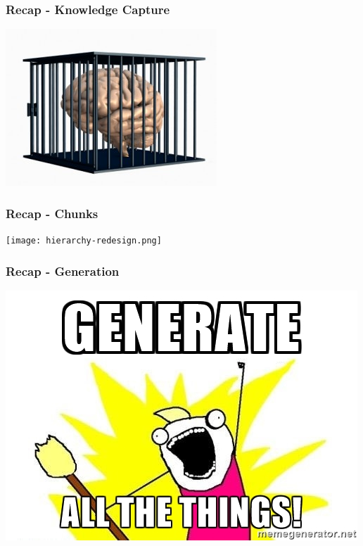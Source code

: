 \documentclass{beamer}
\begin{document}
\begin{frame}

\frametitle{Recap - Knowledge Capture}
\begin{center}
\includegraphics[width=.8\textwidth]{KC.jpg}
\end{center}

\end{frame}


\begin{frame}

\frametitle{Recap - Chunks}

\begin{center}
\texttt{[image: hierarchy-redesign.png]}
\end{center}

\end{frame}


\begin{frame}

\frametitle{Recap - Generation}
\begin{center}
\includegraphics[width=\textwidth]{generate_all_the_things.jpg}
\end{center}

\end{frame}
\end{document}
